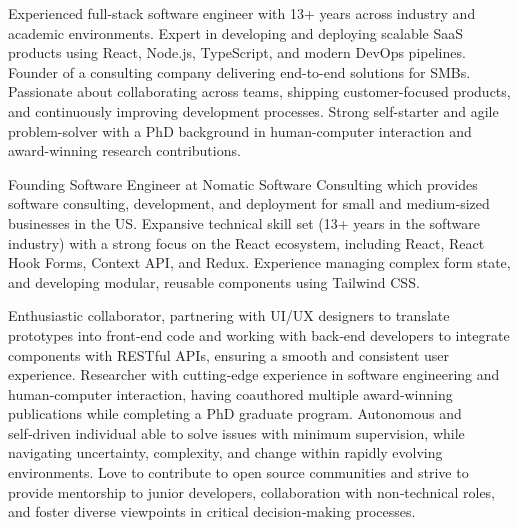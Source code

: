 
\begin{cvparagraph}

\begin{briefSection}
Experienced full-stack software engineer with 13+ years across industry and academic environments.
Expert in developing and deploying scalable SaaS products using React, Node.js, TypeScript, and modern DevOps pipelines.
Founder of a consulting company delivering end-to-end solutions for SMBs.
Passionate about collaborating across teams, shipping customer-focused products, and continuously improving development processes.
Strong self-starter and agile problem-solver with a PhD background in human-computer interaction and award-winning research contributions.  
\end{briefSection}

\begin{detailSection}
Founding Software Engineer at Nomatic Software Consulting which provides software consulting, development, and deployment for small and medium‑sized businesses in the US. Expansive technical skill set (13+ years in the software industry) with a strong focus on the React ecosystem, including React, React Hook Forms, Context API, and Redux. 
Experience managing complex form state, and developing modular, reusable components using Tailwind CSS.

Enthusiastic collaborator, partnering with UI/UX designers to translate prototypes into front‑end code and working with back‑end developers to integrate components with RESTful APIs, ensuring a smooth and consistent user experience. 
Researcher with cutting‑edge experience in software engineering and human‑computer interaction, having coauthored multiple award‑winning publications while completing a PhD graduate program. 
Autonomous and self‑driven individual able to solve issues with minimum supervision, while navigating uncertainty, complexity, and change within rapidly evolving environments. 
Love to contribute to open source communities and strive to provide mentorship to junior developers, collaboration with non‑technical roles, and foster diverse viewpoints in critical decision‑making processes.
\end{detailSection}

\end{cvparagraph}
